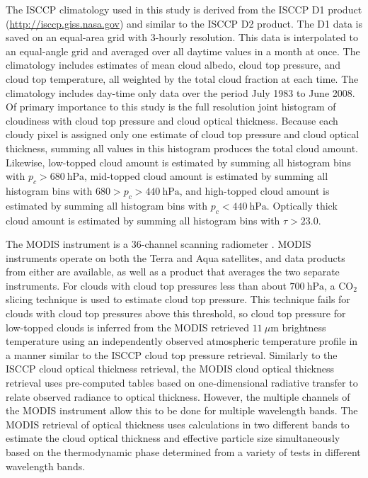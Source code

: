 The ISCCP climatology used in this study is derived from the ISCCP D1 product (\url{http://isccp.giss.nasa.gov}) and similar to the ISCCP D2 product. The D1 data is saved on an equal-area grid with 3-hourly resolution. This data is interpolated to an equal-angle grid and averaged over all daytime values in a month at once. The climatology includes estimates of mean cloud albedo, cloud top pressure, and cloud top temperature, all weighted by the total cloud fraction at each time. The climatology includes day-time only data over the period July 1983 to June 2008. Of primary importance to this study is the full resolution joint histogram of cloudiness with cloud top pressure and cloud optical thickness. Because each cloudy pixel is assigned only one estimate of cloud top pressure and cloud optical thickness, summing all values in this histogram produces the total cloud amount. Likewise, low-topped cloud amount is estimated by summing all histogram bins with $p_c>680~\text{hPa}$, mid-topped cloud amount is estimated by summing all histogram bins with $680>p_c>440~\text{hPa}$, and high-topped cloud amount is estimated by summing all histogram bins with $p_c<440~\text{hPa}$. Optically thick cloud amount is estimated by summing all histogram bins with $\tau>23.0$.

The MODIS instrument is a 36-channel scanning radiometer \citep{king_et_al_2003}. MODIS instruments operate on both the Terra and Aqua satellites, and data products from either are available, as well as a product that averages the two separate instruments. For clouds with cloud top pressures less than about $700 ~\text{hPa}$, a $\text{CO}_2$ slicing technique \citep{menzel_et_al_1983} is used to estimate cloud top pressure. This technique fails for clouds with cloud top pressures above this threshold, so cloud top pressure for low-topped clouds is inferred from the MODIS retrieved $11 ~\mu\text{m}$ brightness temperature using an independently observed atmospheric temperature profile in a manner similar to the ISCCP cloud top pressure retrieval. Similarly to the ISCCP cloud optical thickness retrieval, the MODIS cloud optical thickness retrieval uses pre-computed tables based on one-dimensional radiative transfer to relate observed radiance to optical thickness. However, the multiple channels of the MODIS instrument allow this to be done for multiple wavelength bands. The MODIS retrieval of optical thickness uses calculations in two different bands to estimate the cloud optical thickness and effective particle size simultaneously based on the thermodynamic phase determined from a variety of tests in different wavelength bands.

